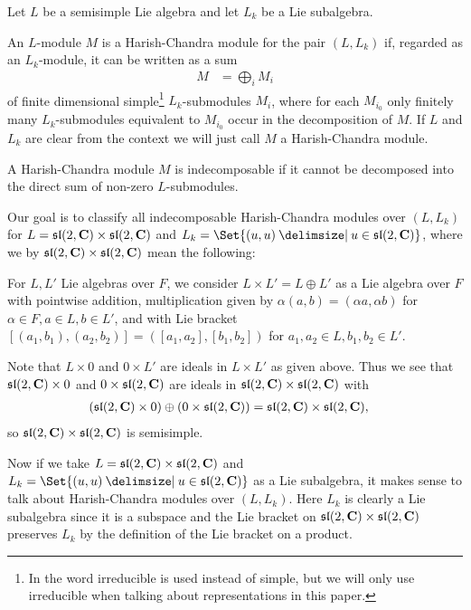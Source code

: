 Let $L$ be a semisimple Lie algebra and let $L_k$ be a Lie subalgebra.
\begin{definition}\label{def:HarishChandra}
  An $L$-module $M$ is a Harish-Chandra module for the pair $(L,L_k)$ if, regarded as an $L_k$-module, it can be written as a sum
  \begin{align*}
    M &= \bigoplus_{i} M_i
  \end{align*}
  of finite dimensional simple\footnote{In \cite{indecompReprOfLorGr} the word irreducible is used instead of simple, but we will only use irreducible when talking about representations in this paper.} $L_k$-submodules $M_i$, where for each $M_{i_0}$ only finitely many $L_k$-submodules equivalent to $M_{i_0}$ occur in the decomposition of $M$. If $L$ and $L_k$ are clear from the context we will just call $M$ a Harish-Chandra module.

  A Harish-Chandra module $M$ is indecomposable if it cannot be decomposed into the direct sum of non-zero $L$-submodules.
\end{definition}

Our goal is to classify all indecomposable Harish-Chandra modules over $(L,L_k)$ for $L=\mathfrak{sl}(2,\mathbf{C})\times \mathfrak{sl}(2,\mathbf{C})$ and $L_k=\Set{(u,u)\given u\in\slc}$, where we by $\mathfrak{sl}(2,\mathbf{C})\times \mathfrak{sl}(2,\mathbf{C})$ mean the following:

For $L,L'$ Lie algebras over $F$, we consider $L\times L'=L\oplus L'$ as a Lie algebra over $F$ with pointwise addition, multiplication given by $\alpha(a,b)=(\alpha a,\alpha b)$ for $\alpha\in F,a\in L,b\in L'$, and with Lie bracket $[(a_1,b_1),(a_2,b_2)]=([a_1,a_2],[b_1,b_2])$ for $a_1,a_2\in L,b_1,b_2\in L'$.

\begin{remark}
  Note that $L\times 0$ and $0\times L'$ are ideals in $L\times L'$ as given above. Thus we see that $\mathfrak{sl}(2,\mathbf{C})\times 0$ and $0\times \mathfrak{sl}(2,\mathbf{C})$ are ideals in $\mathfrak{sl}(2,\mathbf{C})\times \mathfrak{sl}(2,\mathbf{C})$ with
  \begin{align*}
    (\mathfrak{sl}(2,\mathbf{C})\times 0) \oplus (0\times\mathfrak{sl}(2,\mathbf{C})) &= \mathfrak{sl}(2,\mathbf{C})\times \mathfrak{sl}(2,\mathbf{C}),
  \end{align*}
  so $\mathfrak{sl}(2,\mathbf{C})\times \mathfrak{sl}(2,\mathbf{C})$ is semisimple. 

  Now if we take $L=\mathfrak{sl}(2,\mathbf{C})\times \mathfrak{sl}(2,\mathbf{C})$ and $L_k=\Set{(u,u)\given u\in\slc}$ as a Lie subalgebra, it makes sense to talk about Harish-Chandra modules over $(L,L_k)$. Here $L_k$ is clearly a Lie subalgebra since it is a subspace and the Lie bracket on $\mathfrak{sl}(2,\mathbf{C})\times \mathfrak{sl}(2,\mathbf{C})$ preserves $L_k$ by the definition of the Lie bracket on a product. 
\end{remark}

